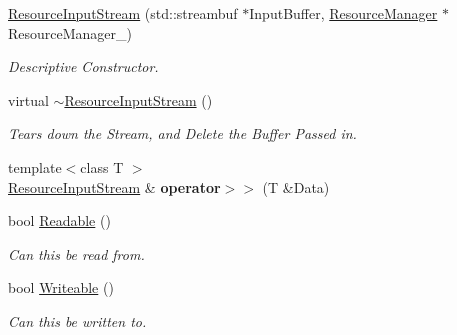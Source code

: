 \begin{DoxyCompactItemize}
\item 
\hyperlink{classMezzanine_1_1ResourceInputStream_a03a7bc47014d7d27cf0db3c0fff68715}{ResourceInputStream} (std::streambuf $\ast$InputBuffer, \hyperlink{classMezzanine_1_1ResourceManager}{ResourceManager} $\ast$ResourceManager\_\-)
\begin{DoxyCompactList}\small\item\em Descriptive Constructor. \item\end{DoxyCompactList}\item 
\hypertarget{classMezzanine_1_1ResourceInputStream_ac99716411e0277ffd97b2db98003fc54}{
virtual \hyperlink{classMezzanine_1_1ResourceInputStream_ac99716411e0277ffd97b2db98003fc54}{$\sim$ResourceInputStream} ()}
\label{classMezzanine_1_1ResourceInputStream_ac99716411e0277ffd97b2db98003fc54}

\begin{DoxyCompactList}\small\item\em Tears down the Stream, and Delete the Buffer Passed in. \item\end{DoxyCompactList}\item 
\hypertarget{classMezzanine_1_1ResourceInputStream_a241faad0fdcadeca6288a3f49797c05d}{
{\footnotesize template$<$class T $>$ }\\\hyperlink{classMezzanine_1_1ResourceInputStream}{ResourceInputStream} \& {\bfseries operator$>$$>$} (T \&Data)}
\label{classMezzanine_1_1ResourceInputStream_a241faad0fdcadeca6288a3f49797c05d}

\item 
bool \hyperlink{classMezzanine_1_1ResourceInputStream_a1a09cf1e237b4344df907b799af52e96}{Readable} ()
\begin{DoxyCompactList}\small\item\em Can this be read from. \item\end{DoxyCompactList}\item 
bool \hyperlink{classMezzanine_1_1ResourceInputStream_ae2fa58b048fedc97126184a72ccb7689}{Writeable} ()
\begin{DoxyCompactList}\small\item\em Can this be written to. \item\end{DoxyCompactList}\end{DoxyCompactItemize}


